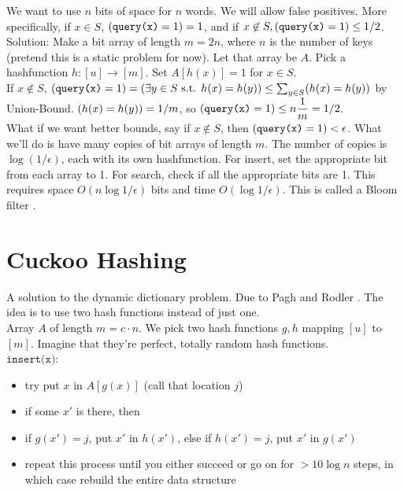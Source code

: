\documentclass[11pt]{article}
\let\Pr\relax
\DeclareMathOperator*{\Pr}{\mathbb{P}}
\theoremstyle{definition}
\begin{document}
We want to use $n$ bits of space for $n$ words. We will allow false positives. More specifically, if $x \in S$, $\Pr(\texttt{query(x)}=1) = 1$, and if $x \not \in S, \Pr( \texttt{query(x)}=1) \leq 1/2$.\\

Solution: Make a bit array of length $m=2n$, where $n$ is the number of keys (pretend this is a static problem for now). Let that array be $A$. Pick a hashfunction $h: [u] \rightarrow [m]$. Set $A[h(x)]=1$ for $x \in S$.\\

If $x \not \in S$,  $\Pr(\texttt{query(x)}=1) = \Pr(\exists {y \in S} \text{ s.t. } h(x)=h(y)) \leq \sum_{y \in S} \Pr(h(x) = h(y))$ by Union-Bound. $\Pr(h(x)=h(y)) = 1/m$, so $\Pr(\texttt{query(x)}=1) \leq n \dfrac{1}{m} = 1/2$.\\

What if we want better bounds, say if $x \not \in S$, then $\Pr(\texttt{query(x)} = 1) < \epsilon$. What we'll do is have many copies of bit arrays of length $m$. The number of copies is $\log(1/\epsilon)$, each with its own hashfunction. For insert, set the appropriate bit from each array to 1. For search, check if all the appropriate bits are 1. This requires space $O(n\log 1/\epsilon)$ bits and time $O(\log 1/\epsilon)$. This is called a Bloom filter \cite{b}.

\section{Cuckoo Hashing}
A solution to the dynamic dictionary problem. Due to Pagh and Rodler \cite{pr}. The idea is to use two hash functions instead of just one.\\

Array $A$ of length $m=c \cdot n$. We pick two hash functions $g,h$ mapping $[u]$ to $[m]$. Imagine that they're perfect, totally random hash functions.\\

$\texttt{insert(x)}$:
\begin{itemize}
\item try put $x$ in $A[g(x)]$ (call that location $j$)
\item if some $x'$ is there, then
\item if $g(x') = j$, put $x'$ in $h(x')$, else if $h(x')=j$, put $x'$ in $g(x')$
\item repeat this process until you either succeed or go on for $>10\log n$ steps, in which case rebuild the entire data structure
\end{itemize}
\end{document}
